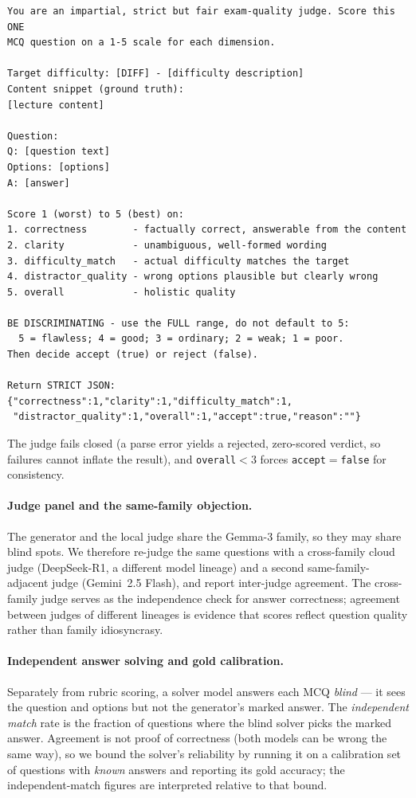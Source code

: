 \begin{verbatim}
You are an impartial, strict but fair exam-quality judge. Score this ONE
MCQ question on a 1-5 scale for each dimension.

Target difficulty: [DIFF] - [difficulty description]
Content snippet (ground truth):
[lecture content]

Question:
Q: [question text]
Options: [options]
A: [answer]

Score 1 (worst) to 5 (best) on:
1. correctness        - factually correct, answerable from the content
2. clarity            - unambiguous, well-formed wording
3. difficulty_match   - actual difficulty matches the target
4. distractor_quality - wrong options plausible but clearly wrong
5. overall            - holistic quality

BE DISCRIMINATING - use the FULL range, do not default to 5:
  5 = flawless; 4 = good; 3 = ordinary; 2 = weak; 1 = poor.
Then decide accept (true) or reject (false).

Return STRICT JSON:
{"correctness":1,"clarity":1,"difficulty_match":1,
 "distractor_quality":1,"overall":1,"accept":true,"reason":""}
\end{verbatim}

The judge fails closed (a parse error yields a rejected, zero-scored verdict,
so failures cannot inflate the result), and \texttt{overall}$<3$ forces
\texttt{accept}$=$\texttt{false} for consistency.

\paragraph{Judge panel and the same-family objection.} The generator and the
local judge share the Gemma-3 family, so they may share blind spots. We
therefore re-judge the same questions with a cross-family cloud judge
(DeepSeek-R1, a different model lineage) and a second same-family-adjacent
judge (Gemini~2.5 Flash), and report inter-judge agreement. The cross-family
judge serves as the independence check for answer correctness; agreement
between judges of different lineages is evidence that scores reflect question
quality rather than family idiosyncrasy.

\paragraph{Independent answer solving and gold calibration.} Separately from
rubric scoring, a solver model answers each MCQ \emph{blind} --- it sees the
question and options but not the generator's marked answer. The
\emph{independent match} rate is the fraction of questions where the blind
solver picks the marked answer. Agreement is not proof of correctness (both
models can be wrong the same way), so we bound the solver's reliability by
running it on a calibration set of questions with \emph{known} answers and
reporting its gold accuracy; the independent-match figures are interpreted
relative to that bound.

